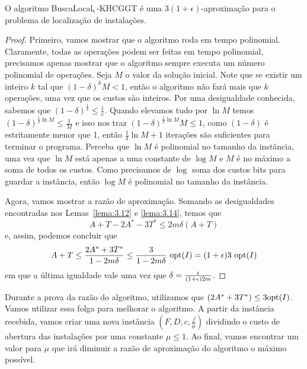\begin{theorem}
    O algoritmo {\sc BuscaLocal$_\epsilon$-KHCGGT} é uma $3(1+\epsilon)$-aproximação para o problema de localização de instalações.
\end{theorem}
\begin{proof}
    Primeiro, vamos mostrar que o algoritmo roda em tempo polinomial. Claramente, todas as operações podem ser feitas em tempo polinomial, precisamos apenas mostrar que o algoritmo sempre executa um número polinomial de operações.
    Seja $M$ o valor da solução inicial. Note que se existir um inteiro $k$ tal que $(1-\delta)^kM < 1$, então o algoritmo não fará mais que $k$ operações, uma vez que os custos são inteiros. Por uma desigualdade conhecida, sabemos que $(1 - \delta)^{\frac{1}{\delta}} \leq \frac{1}{e}$. Quando elevamos tudo por $\ln M$ temos $(1- \delta)^{\frac{1}{\delta}\ln M} \leq \frac{1}{M}$ e isso nos traz $ (1- \delta)^{\frac{1}{\delta}\ln M}M \leq 1$, como $(1-\delta)$ é estritamente menor que 1, então $\frac{1}{\delta}\ln M + 1$ iterações são suficientes para terminar o programa. Perceba que $\ln M$ é polinomial no tamanho da instância, uma vez que $\ln M$ está apenas a uma constante de $\log M$ e $M$ é no máximo a soma de todos os custos. Como precisamos de $\log$ soma dos custos bits para guardar a instância, então $\log M$ é polinomial no tamanho da instância.

    Agora, vamos mostrar a razão de aproximação. Somando as desigualdades encontradas nos Lemas~\ref{lema:3.12} e \ref{lema:3.14}, temos que 
        \[A + T - 2A^* - 3T^* \leq 2m\delta(A+T)\] 
        e, assim, podemos concluir que
        \[A+T \leq \frac{2A^* + 3T^*}{1-2m\delta} \leq \frac{3}{1-2m\delta} \ \mathrm{opt}(I) = (1+\epsilon)3 \ \mathrm{opt}(I)\]
        em que a última igualdade vale uma vez que $\delta = \frac{\epsilon}{(1+\epsilon)2m}$.
\end{proof}
Durante a prova da razão do algoritmo, utilizamos que $(2A^* + 3T^*) \leq 3\mathrm{opt}(I)$. Vamos utilizar essa folga para melhorar o algoritmo. 
A partir da instância recebida, vamos criar uma nova instância $(F,D,c,\frac{f}{\mu})$ dividindo o custo de abertura das instalações por uma constante $\mu \leq 1$. Ao final, vamos encontrar um valor para $\mu$ que irá diminuir a razão de aproximação do algoritmo o máximo possível. 

